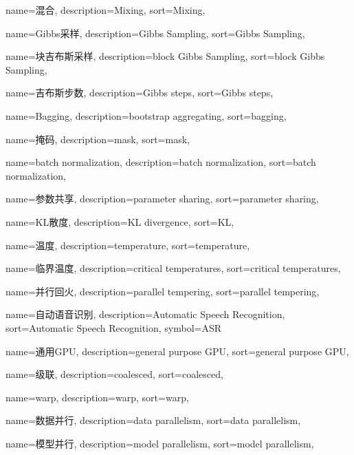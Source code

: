 {
  name=混合,
  description={Mixing},
  sort={Mixing},
}

{
  name=Gibbs采样,
  description={Gibbs Sampling},
  sort={Gibbs Sampling},
}

{
  name=块吉布斯采样,
  description={block Gibbs Sampling},
  sort={block Gibbs Sampling},
}

{
  name=吉布斯步数,
  description={Gibbs steps},
  sort={Gibbs steps},
}

{
  name=Bagging,
  description={bootstrap aggregating},
  sort={bagging},
}

{
  name=掩码,
  description={mask},
  sort={mask},
}

{
  name=batch normalization,
  description={batch normalization},
  sort={batch normalization},
}

{
  name=参数共享,
  description={parameter sharing},
  sort={parameter sharing},
}

{
  name=KL散度,
  description={KL divergence},
  sort={KL},
}

{
  name=温度,
  description={temperature},
  sort={temperature},
}

{
  name=临界温度,
  description={critical temperatures},
  sort={critical temperatures},
}

{
  name=并行回火,
  description={parallel tempering},
  sort={parallel tempering},
}

{
  name=自动语音识别,
  description={Automatic Speech Recognition},
  sort={Automatic Speech Recognition},
  symbol={ASR}
}

{
  name=通用GPU,
  description={general purpose GPU},
  sort={general purpose GPU},
}

{
  name=级联,
  description={coalesced},
  sort={coalesced},
}

{
  name=warp,
  description={warp},
  sort={warp},
}

{
  name=数据并行,
  description={data parallelism},
  sort={data parallelism},
}

{
  name=模型并行,
  description={model parallelism},
  sort={model parallelism},
}

